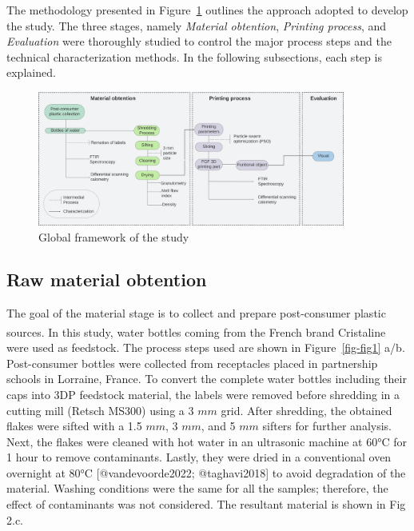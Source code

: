 \documentclass[
  letterpaper,
  DIV=11,
  numbers=noendperiod]{scrartcl}
\begin{document}
The methodology presented in Figure~\ref{fig-1} outlines the approach
adopted to develop the study. The three stages, namely \emph{Material
obtention}, \emph{Printing process}, and \emph{Evaluation} were
thoroughly studied to control the major process steps and the technical
characterization methods. In the following subsections, each step is
explained.

\begin{figure}

{\centering \includegraphics[width=0.9\textwidth,height=\textheight]{figures/Fig_1_framework.png}

}

\caption{\label{fig-1}Global framework of the study}

\end{figure}

\hypertarget{raw-material-obtention}{%
\subsection{Raw material obtention}\label{raw-material-obtention}}

The goal of the material stage is to collect and prepare post-consumer
plastic sources. In this study, water bottles coming from the French
brand Cristaline\textsuperscript{\textcopyright} were used as feedstock.
The process steps used are shown in Figure~\ref{fig-fig1} a/b.
Post-consumer bottles were collected from receptacles placed in
partnership schools in Lorraine, France. To convert the complete water
bottles including their caps into 3DP feedstock material, the labels
were removed before shredding in a cutting mill (Retsch MS300) using a 3
\(mm\) grid. After shredding, the obtained flakes were sifted with a 1.5
\(mm\), 3 \(mm\), and 5 \(mm\) sifters for further analysis. Next, the
flakes were cleaned with hot water in an ultrasonic machine at 60°C for
1 hour to remove contaminants. Lastly, they were dried in a conventional
oven overnight at 80°C {[}@vandevoorde2022; @taghavi2018{]} to avoid
degradation of the material. Washing conditions were the same for all
the samples; therefore, the effect of contaminants was not considered.
The resultant material is shown in Fig 2.c.
\end{document}
